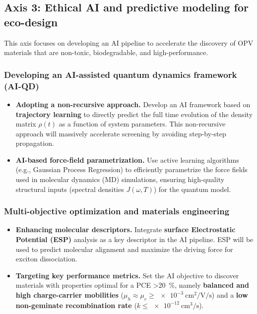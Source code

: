 \documentclass[12pt, a4paper]{article}
\begin{document}
\subsection{Axis 3: Ethical AI and predictive modeling for eco-design}

This axis focuses on developing an AI pipeline to accelerate the discovery of OPV materials that are non-toxic, biodegradable, and high-performance.

\subsubsection{Developing an AI-assisted quantum dynamics framework (AI-QD)}
\begin{itemize}
    \item \textbf{Adopting a non-recursive approach.} Develop an AI framework based on \textbf{trajectory learning} to directly predict the full time evolution of the density matrix $\rho(t)$ as a function of system parameters. This non-recursive approach will massively accelerate screening by avoiding step-by-step propagation.

    \item \textbf{AI-based force-field parametrization.} Use active learning algorithms (e.g., Gaussian Process Regression) to efficiently parametrize the force fields used in molecular dynamics (MD) simulations, ensuring high-quality structural inputs (spectral densities $J(\omega, T)$) for the quantum model.
\end{itemize}

\subsubsection{Multi-objective optimization and materials engineering}
\begin{itemize}
    \item \textbf{Enhancing molecular descriptors.} Integrate \textbf{surface Electrostatic Potential (ESP)} analysis as a key descriptor in the AI pipeline. ESP will be used to predict molecular alignment and maximize the driving force for exciton dissociation.

    \item \textbf{Targeting key performance metrics.} Set the AI objective to discover materials with properties optimal for a PCE \SI{>20}{\percent}, namely \textbf{balanced and high charge-carrier mobilities} ($\mu_h \approx \mu_e \geq \SI{e-3}{\centi\meter\squared\per\volt\per\second}$) and a \textbf{low non-geminate recombination rate} ($k \leq \SI{e-12}{\centi\meter\cubed\per\second}$).
\end{itemize}
\end{document}
